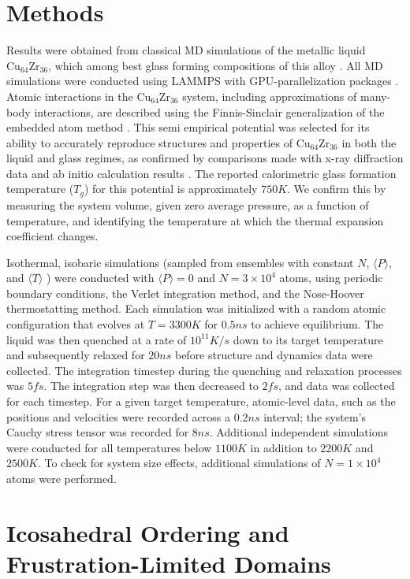 \documentclass[aps,prl,preprint,showpacs,amsmath,floatfix,superscriptaddress]{revtex4}
\begin{document}
\section{Methods}
Results were obtained from classical MD simulations
of the metallic liquid $\mathrm{Cu_{64}Zr_{36}}$, which among best glass forming compositions
of this alloy \cite{Bendert2012}.
All MD simulations were conducted using LAMMPS \cite{lammps} with
GPU-parallelization packages \cite{gpu}. Atomic interactions
in the Cu$_{64}$Zr$_{36}$ system, including approximations of many-body
interactions, are described using the Finnis-Sinclair generalization of the
embedded atom method \cite{EAM}. This semi empirical potential was selected for its
ability to accurately reproduce structures and properties of Cu$_{64}$Zr$_{36}$ in
both the liquid and glass regimes, as confirmed by comparisons made with x-ray diffraction data and ab initio calculation results \cite{Mendelev2009}. The reported
calorimetric glass formation temperature ($T_{g}$) for this potential is
approximately $750 K$. We confirm this by measuring the system
volume, given zero average pressure, as a function of temperature,
and identifying the temperature at which the thermal expansion coefficient
changes.

Isothermal, isobaric simulations (sampled from ensembles with
constant $N$, $\langle P \rangle$, and $\langle T \rangle$
\cite{NPT}) were conducted with $\langle P \rangle = 0$ and
$N=3\times 10^{4}$ atoms, using periodic boundary conditions, the
Verlet integration method, and the Nose-Hoover thermostatting
method. Each simulation was initialized with a random atomic
configuration that evolves at $T= 3300 K$ for $0.5 ns$ to achieve
equilibrium. The liquid was then quenched at a rate of $10^{11}
K/s$ down to its target temperature and subsequently relaxed for
$20 ns$ before structure and dynamics data were collected. The
integration timestep during the quenching and relaxation processes
was $5 fs$. The integration step was then decreased to $2 fs$, and
data was collected for each timestep. For a given target
temperature, atomic-level data, such as the positions and
velocities were recorded across a $0.2 ns$ interval; the system's
Cauchy stress tensor was recorded for $8 ns$. Additional
independent simulations were conducted for all temperatures below
$1100 K$ in addition to $2200 K$ and $2500 K$. To check for system
size effects, additional simulations of $N=1\times 10^{4}$ atoms
were performed.


\section{Icosahedral Ordering and Frustration-Limited Domains}
\end{document}
